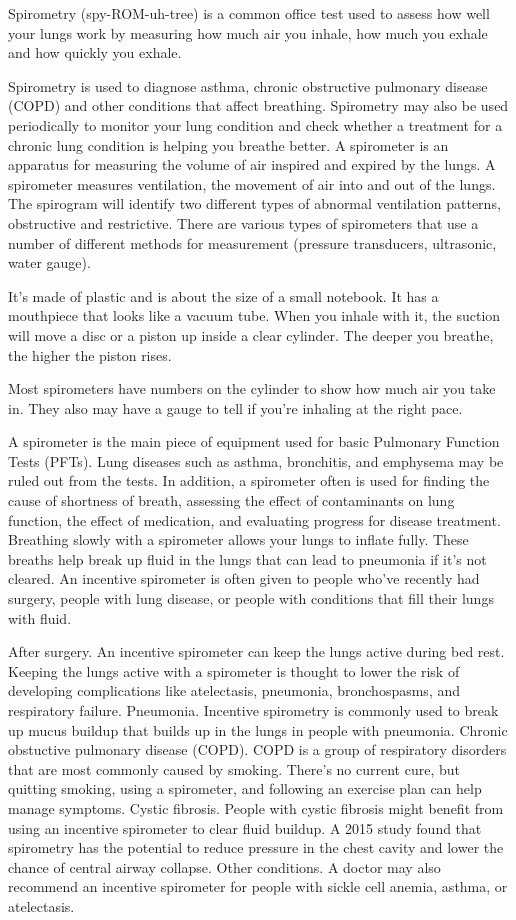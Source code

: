 \documentclass[a4paper,12pt]{article}
\begin{document}
Spirometry (spy-ROM-uh-tree) is a common office test used to assess how well your lungs work by measuring how much air you inhale, how much you exhale and how quickly you exhale.

Spirometry is used to diagnose asthma, chronic obstructive pulmonary disease (COPD) and other conditions that affect breathing. Spirometry may also be used periodically to monitor your lung condition and check whether a treatment for a chronic lung condition is helping you breathe better.
A spirometer is an apparatus for measuring the volume of air inspired and expired by the lungs. A spirometer measures ventilation, the movement of air into and out of the lungs. The spirogram will identify two different types of abnormal ventilation patterns, obstructive and restrictive. There are various types of spirometers that use a number of different methods for measurement (pressure transducers, ultrasonic, water gauge).

It’s made of plastic and is about the size of a small notebook. It has a mouthpiece that looks like a vacuum tube. When you inhale with it, the suction will move a disc or a piston up inside a clear cylinder. The deeper you breathe, the higher the piston rises.

Most spirometers have numbers on the cylinder to show how much air you take in. They also may have a gauge to tell if you’re inhaling at the right pace.
  
  A spirometer is the main piece of equipment used for basic Pulmonary Function Tests (PFTs). Lung diseases such as asthma, bronchitis, and emphysema may be ruled out from the tests. In addition, a spirometer often is used for finding the cause of shortness of breath, assessing the effect of contaminants on lung function, the effect of medication, and evaluating progress for disease treatment.
  Breathing slowly with a spirometer allows your lungs to inflate fully. These breaths help break up fluid in the lungs that can lead to pneumonia if it’s not cleared. 
  An incentive spirometer is often given to people who’ve recently had surgery, people with lung disease, or people with conditions that fill their lungs with fluid. 
  
  After surgery. An incentive spirometer can keep the lungs active during bed rest. Keeping the lungs active with a spirometer is thought to lower the risk of developing complications like atelectasis, pneumonia, bronchospasms, and respiratory failure. 
  Pneumonia. Incentive spirometry is commonly used to break up mucus buildup that builds up in the lungs in people with pneumonia. 
  Chronic obstuctive pulmonary disease (COPD). COPD is a group of respiratory disorders that are most commonly caused by smoking. There’s no current cure, but quitting smoking, using a spirometer, and following an exercise plan can help manage symptoms. 
  Cystic fibrosis. People with cystic fibrosis might benefit from using an incentive spirometer to clear fluid buildup. A 2015 study found that spirometry has the potential to reduce pressure in the chest cavity and lower the chance of central airway collapse. 
  Other conditions. A doctor may also recommend an incentive spirometer for people with sickle cell anemia, asthma, or atelectasis.
 
\end{document}
